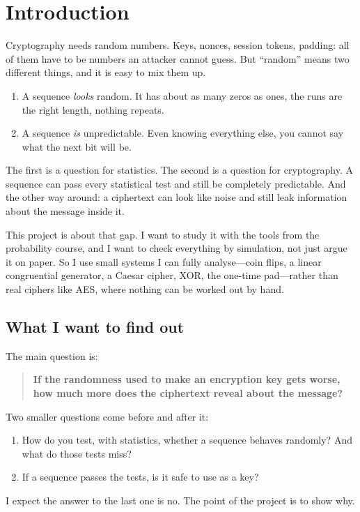 
\section{Introduction}\label{sec:intro}

Cryptography needs random numbers. Keys, nonces, session tokens, padding:
all of them have to be numbers an attacker cannot guess. But ``random'' means two
different things, and it is easy to mix them up.
\begin{enumerate}
  \item A sequence \emph{looks} random. It has about as many zeros as ones,
        the runs are the right length, nothing repeats.
  \item A sequence \emph{is} unpredictable. Even knowing everything else, you
        cannot say what the next bit will be.
\end{enumerate}
The first is a question for statistics. The second is a question for
cryptography. A sequence can pass every statistical test and still be
completely predictable. And the other way around: a ciphertext can look like
noise and still leak information about the message inside it.

This project is about that gap. I want to study it with the tools from the
probability course, and I want to check everything by simulation, not just
argue it on paper. So I use small systems I can fully analyse---coin flips, a
linear congruential generator, a Caesar cipher, XOR, the one-time pad---rather
than real ciphers like AES, where nothing can be worked out by hand.

\subsection{What I want to find out}\label{sec:questions}

The main question is:
\begin{quote}
  \textbf{If the randomness used to make an encryption key gets worse, how
  much more does the ciphertext reveal about the message?}
\end{quote}
Two smaller questions come before and after it:
\begin{enumerate}
  \item How do you test, with statistics, whether a sequence behaves
        randomly? And what do those tests miss?
  \item If a sequence passes the tests, is it safe to use as a key?
\end{enumerate}
I expect the answer to the last one is no.  The point of the project is to
show why.

